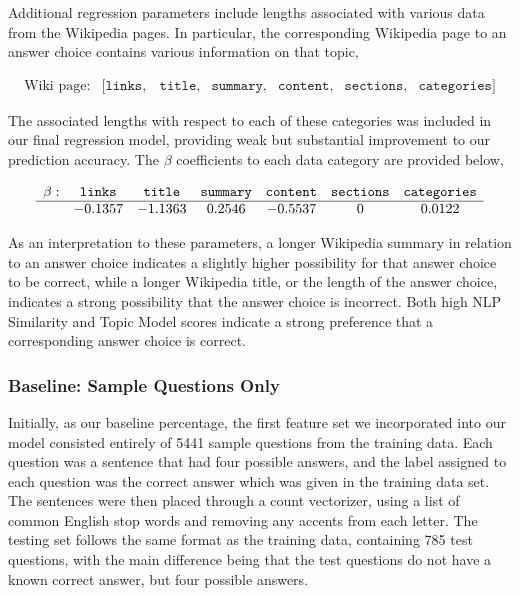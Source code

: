 \documentclass{article}
\theoremstyle{mystuff}
\theoremstyle{myexample}
\theoremstyle{named}
\begin{document}
Additional regression parameters include lengths associated with various data from the Wikipedia pages. In particular, the corresponding Wikipedia page to an answer choice contains various information on that topic,

\[
	\begin{array}{lllllll}
		\text{Wiki page}: & [\texttt{links}, & \texttt{title}, & \texttt{summary}, & \texttt{content}, & \texttt{sections}, & \texttt{categories}]
	\end{array}
\]

The associated lengths with respect to each of these categories was included in our final regression model, providing weak but substantial improvement to our prediction accuracy. The $\beta$ coefficients  to each data category are provided below,

\[
	\begin{array}{lcccccc}
		\textbf{$\beta$}: & \texttt{links} & \texttt{title} & \texttt{summary} & \texttt{content} & \texttt{sections} & \texttt{categories} \\\hline
			& -0.1357 & -1.1363 & 0.2546 & -0.5537 & 0 & 0.0122
	\end{array}
\]

\noindent As an interpretation to these parameters, a longer Wikipedia summary in relation to an answer choice indicates a slightly higher possibility for that answer choice to be correct, while a longer Wikipedia title, or the length of the answer choice, indicates a strong possibility that the answer choice is incorrect. Both high NLP Similarity and Topic Model scores indicate a strong preference that a corresponding answer choice is correct.

\subsubsection{Baseline: Sample Questions Only}
Initially, as our baseline percentage, the first feature set we incorporated into our model consisted entirely of 5441 sample questions from the training data.  Each question was a sentence that had four possible answers, and the label assigned to each question was the correct answer which was given in the training data set.\\

 The sentences were then placed through a count vectorizer, using a list of common English stop words and removing any accents from each letter.  The testing set follows the same format as the training data, containing 785 test questions, with the main difference being that the test questions do not have a known correct answer, but four possible answers. \\
\end{document}
